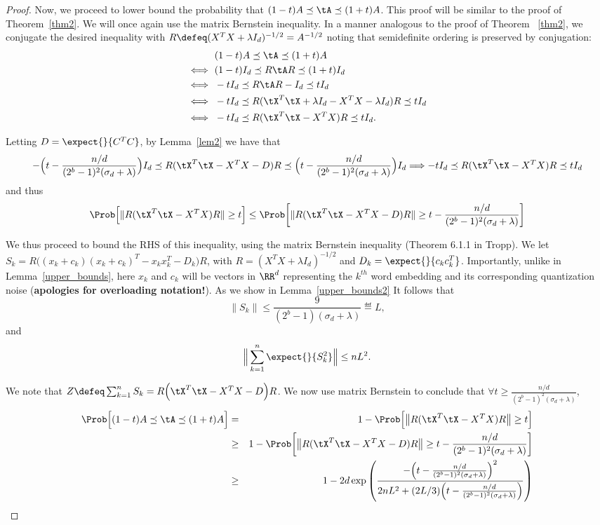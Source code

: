 \documentclass[12pt]{article}
\begin{document}
\begin{proof}
	Now, we proceed to lower bound the probability that $(1-t)A \preceq \tA \preceq (1+t)A$.  This proof will be similar to the proof of Theorem~\ref{thm2}. We will once again use the matrix Bernstein inequality. In a manner analogous to the proof of Theorem ~\ref{thm2}, we conjugate the desired inequality with $R \defeq (X^T X + \lambda I_d)^{-1/2} = A^{-1/2}$ noting that semidefinite ordering is preserved by conjugation:
	\begin{align*}
	&(1 - t) A \preceq \tA \preceq (1 + t) A \\
	\iff\ &(1 - t) I_d \preceq R \tA R \preceq (1 + t) I_d \\
	\iff\ &-t I_d \preceq R \tA R - I_d \preceq t I_d \\
	\iff\ &-t I_d \preceq R (\tX^T \tX + \lambda I_d - X^T X - \lambda I_d) R \preceq t I_d \\
	\iff\ &-t I_d \preceq R (\tX^T \tX - X^T X) R \preceq t I_d.
	\end{align*}
	
	Letting $D=\expect{}{C^TC}$, by Lemma~\ref{lem2} we have that 
	$$-\Big(t - \frac{n/d}{(2^b-1)^2(\sigma_d + \lambda)}\Big) I_d \preceq R (\tX^T \tX - X^T X - D) R \preceq
	\Big(t - \frac{n/d}{(2^b-1)^2(\sigma_d + \lambda)}\Big) I_d 
	\Longrightarrow -t I_d \preceq R (\tX^T \tX - X^T X) R \preceq
	t I_d$$
	and thus
	$$\Prob\Big[ \|R (\tX^T \tX - X^T X) R\| \geq t\Big] \leq  \Prob\bigg[ \|R (\tX^T \tX - X^T X -D) R\| \geq t-\frac{n/d}{(2^b-1)^2(\sigma_d + \lambda)}\bigg]  $$
	
	We thus proceed to bound the RHS of this inequality, using the matrix Bernstein inequality (Theorem 6.1.1 in Tropp).  We let $S_k = R\Big((x_k + c_k)(x_k + c_k)^T  - x_k x_k^T - D_k\Big)R$, with $R=(X^T X+\lambda I_d)^{-1/2}$ and $D_k = \expect{}{c_kc_k^T}$. Importantly, unlike in Lemma~\ref{upper_bounds}, here $x_k$ and $c_k$ will be vectors in $\RR^d$ representing the $k^{th}$ word embedding and its corresponding quantization noise (\textbf{apologies for overloading notation!}).  As we show in Lemma~\ref{upper_bounds2}
	It follows that
	$$\|S_k\| \leq \frac{9}{(2^b-1)(\sigma_d + \lambda)} \eqdef L,$$
	and
	$$\Big\|\sum_{k=1}^n \expect{}{S_k^2}\Big\| \leq nL^2.$$
	
	We note that $Z\defeq \sum_{k=1}^n S_k = R\Big(\tX^T \tX - X^T X - D\Big)R$.  We now use matrix Bernstein to conclude that $\forall t \geq \frac{n/d}{(2^b-1)^2(\sigma_d + \lambda)}$, 
	\begin{eqnarray*}
		\Prob\Big[ (1 - t) A \preceq \tA \preceq (1 + t) A\Big] &=& 
		1- \Prob\Big[\big\|R (\tX^T \tX - X^T X) R\big\| \geq t\Big]\\ 
		&\geq& 1- \Prob\bigg[ \big\|R (\tX^T \tX - X^T X -D) R\big\| \geq t-\frac{n/d}{(2^b-1)^2(\sigma_d + \lambda)}\bigg] \\
		&\geq& 1- 2d \exp \left(\frac{-\Big(t-\frac{n/d}{(2^b-1)^2(\sigma_d + \lambda)}\Big)^2}{2nL^2 + (2L/3)\Big(t-\frac{n/d}{(2^b-1)^2(\sigma_d + \lambda)}\Big)} \right)
	\end{eqnarray*}
\end{proof}
\end{document}
